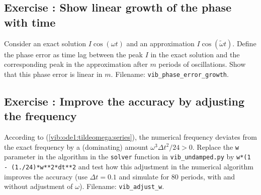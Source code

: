 \documentclass[%
oneside,                 %
final,                   %
10pt]{article}
\newenvironment{doconceexercise}{}{}
\newcounter{doconceexercisecounter}
\begin{document}
\begin{doconceexercise}

\subsection*{Exercise \thedoconceexercisecounter: Show linear growth of the phase with time}

\label{vib:exer:phase:err:growth}

Consider an exact solution $I\cos (\omega t)$ and an
approximation $I\cos(\tilde\omega t)$.
Define the phase error as time lag between the peak $I$
in the exact solution and the corresponding peak in the approximation
after $m$ periods of oscillations. Show that this phase error
is linear in $m$.
\noindent Filename: \Verb!vib_phase_error_growth!.

\end{doconceexercise}




\begin{doconceexercise}

\subsection*{Exercise \thedoconceexercisecounter: Improve the accuracy by adjusting the frequency}

\label{vib:exer:w:adjust}

According to (\ref{vib:ode1:tildeomega:series}), the numerical
frequency deviates from the exact frequency by a (dominating) amount
$\omega^3\Delta t^2/24 >0$. Replace the \texttt{w} parameter in the algorithm
in the \texttt{solver} function in \Verb!vib_undamped.py! by \texttt{w*(1 - (1./24)*w**2*dt**2} and test how this adjustment in the numerical
algorithm improves the accuracy (use $\Delta t =0.1$ and simulate
for 80 periods, with and without adjustment of $\omega$).
\noindent Filename: \Verb!vib_adjust_w!.


\end{doconceexercise}
\end{document}

